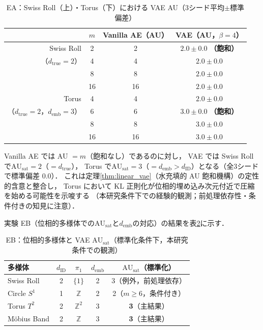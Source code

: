 \documentclass[11pt,a4paper]{jsarticle}
\newcommand{\dID}{d_{\mathrm{ID}}}
\newcommand{\dtrue}{d_{\mathrm{true}}}
\newcommand{\AUsat}{\mathrm{AU}_{\mathrm{sat}}}
\newcommand{\demb}{d_{\mathrm{emb}}}
\begin{document}
\begin{table}[H]
\centering
\caption{EA：Swiss Roll（上）・Torus（下）における VAE AU（3シード平均$\pm$標準偏差）}
\label{tab:ea_summary}
\small
\begin{tabular}{rccc}
\toprule
 & $m$ & Vanilla AE（AU） & VAE（AU，$\beta=4$） \\
\midrule
Swiss Roll & 2 & 2 & $2.0\pm0.0$ \textbf{（飽和）} \\
（$\dtrue = 2$） & 4 & 4 & $2.0\pm0.0$ \\
 & 8 & 8 & $2.0\pm0.0$ \\
 & 16 & 16 & $2.0\pm0.0$ \\
\midrule
Torus & 4 & 4 & $2.0\pm0.0$ \\
（$\dtrue = 2$，$\demb = 3$） & 6 & 6 & $3.0\pm0.0$ \textbf{（飽和）} \\
 & 8 & 8 & $3.0\pm0.0$ \\
 & 16 & 16 & $3.0\pm0.0$ \\
\bottomrule
\end{tabular}
\end{table}

Vanilla AE では AU $= m$（飽和なし）であるのに対し，
VAE では Swiss Roll で$\AUsat = 2$（$= \dtrue$），
Torus で$\AUsat = 3$（$= \demb > \dID$）となる（全3シードで標準偏差 0.0）．
これは定理\ref{thm:linear_vae}（水充填的 AU 飽和機構）の定性的含意と整合し，
Torus において KL 正則化が位相的埋め込み次元付近で圧縮を始める可能性を示唆する
（本研究条件下での経験的観測；前処理依存性・条件付きの知見に注意）．

実験 EB（位相的多様体での$\AUsat$と$\demb$の対応）の結果を表\ref{tab:eb_summary}に示す．

\begin{table}[H]
\centering
\caption{EB：位相的多様体と VAE $\AUsat$（標準化条件下，本研究条件での観測）}
\label{tab:eb_summary}
\small
\begin{tabular}{lcccc}
\toprule
多様体 & $\dID$ & $\pi_1$ & $\demb$ & $\AUsat$（標準化） \\
\midrule
Swiss Roll   & 2 & $\{1\}$        & 2 & 3（例外，前処理依存）\\
Circle $S^1$ & 1 & $\mathbb{Z}$   & 2 & 2（$m \geq 6$，条件付き）\\
Torus $T^2$  & 2 & $\mathbb{Z}^2$ & 3 & \textbf{3}（主結果）\\
Möbius Band  & 2 & $\mathbb{Z}$   & 3 & \textbf{3}（主結果）\\
\bottomrule
\end{tabular}
\end{table}
\end{document}
